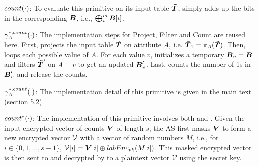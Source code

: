  $count(\cdot)$: To evaluate this primitive on its input table $\boldsymbol{\tilde{T}}$, \system simply  adds up the bits in the corresponding $\boldsymbol{B}$, i.e., $\bigoplus_{i}^m \boldsymbol{B}[i]$.


 $\gamma^{*,count}_{A}(\cdot)$: The implementation steps for \textsf{Project}, \textsf{Filter} and \textsf{Count} are reused here. First, \system projects the input table $\boldsymbol{\tilde{T}}$ on attribute $A$, i.e. $\boldsymbol{\tilde{T}}_1 = \pi_A(\boldsymbol{\tilde{T}})$. Then, \system loops each possible value of $A$. For each value $v$, \system initializes a temporary $\boldsymbol{B}_v=\boldsymbol{B}$ and filters $\boldsymbol{\tilde{T}}'$ on $A=v$ to get an updated $\boldsymbol{B}'_v$. Last, \system counts the number of 1s in $\boldsymbol{B}'_v$ and release the counts.


 $\gamma^{*,count}_A(\cdot)$: The implementation detail of this primitive is given in the main text (section 5.2).

  $count^*(\cdot)$: The implementation of this primitive involves both \AS and \CPS. Given the input encrypted vector of counts $\boldsymbol{V}$ of length $s$, the AS first masks $\boldsymbol{V}$ to form a new encrypted vector ${\bf \mathcal{V}}$ with a vector of random numbers $M$, i.e., for $i\in \{0,1,\ldots, s-1\}$,
${\bf \mathcal{V}}[i] = {\boldsymbol{V}}[i] \oplus labEnc_{pk}(M[i]).$
This masked encrypted vector is then sent to \CPS and decrypted by \CPS to a plaintext vector $\mathcal{V}$ using the secret key.

